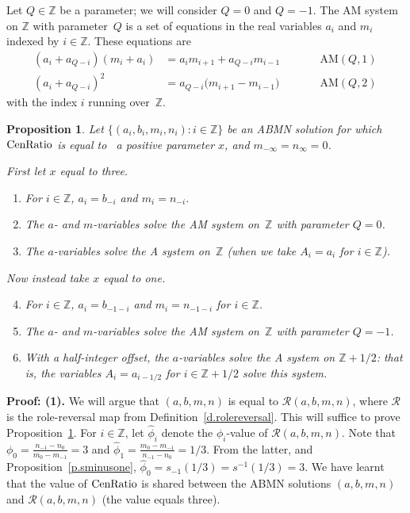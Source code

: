 \documentclass[letterpaper,11pt,oneside,reqno]{amsbook}
\newcommand{\Z}{\ensuremath{\mathbb{Z}}}
\numberwithin{figure}{chapter}
\newtheorem{proposition}[theorem]{Proposition}
\theoremstyle{definition}
\theoremstyle{definition}
\theoremstyle{definition}
\theoremstyle{definition}
\theoremstyle{definition}
\newcommand{\mc}{\mathcal}
\newcommand{\centralratio}{{\rm CenRatio}}
\newcommand{\abmnmacspace}{\textrm{ABMN} }
\newcommand{\ammacspace}{\textrm{AM} }
\newcommand{\amacspace}{\textrm{A} }
\begin{document}
Let $Q \in \Z$ be a parameter; we will consider $Q =0$ and $Q=-1$. The \ammacspace system on $\Z$ with parameter~$Q$ is a set of equations in the real variables $a_i$ and $m_i$ indexed by $i \in \Z$. These equations are
\begin{align*}
  (a_i + a_{Q-i})(m_i+a_i)  & =  a_i m_{i+1} + a_{Q-i} m_{i-1} && \qquad \textrm{AM}(Q,1)  \\
    (a_i + a_{Q-i})^2  & =  a_{Q-i} \big( m_{i+1} - m_{i-1} \big)  && \qquad \textrm{AM}(Q,2) \, 
  \end{align*}
with the index $i$ running over~$\Z$.
\begin{proposition}\label{p.symmetric}
Let $\big\{ (a_i,b_i,m_i,n_i): i \in \Z \big\}$ be an \abmnmacspace solution for which $\centralratio$ is equal to~ a positive parameter $x$, and $m_{-\infty} = n_\infty = 0$.

First let $x$ equal to three. 
\begin{enumerate}
\item For $i \in \Z$, $a_i = b_{-i}$ and $m_i = n_{-i}$.  
\item The $a$- and $m$-variables solve the \ammacspace system on~$\Z$ with parameter $Q= 0$. 
\item The $a$-variables solve the \amacspace system on~$\Z$ (when we take $A_i = a_i$ for $i \in \Z$).
 \end{enumerate}
 Now instead take $x$ equal to one.  
 \begin{enumerate}
 \setcounter{enumi}{3}
\item For $i \in \Z$,  $a_i = b_{-1-i}$ and $m_i = n_{-1-i}$ for $i \in \Z$. 
\item The $a$- and $m$-variables solve the \ammacspace system on~$\Z$ with parameter $Q= -1$.
\item 
With a half-integer offset, the $a$-variables solve the \amacspace system on $\Z + 1/2$: that is, the variables $A_i = a_{i-1/2}$ for $i \in \Z + 1/2$ solve this system.
\end{enumerate}
\end{proposition}
{\bf Proof: (1).} We will argue that $(a,b,m,n)$ is equal to $\mc{R}(a,b,m,n)$, where $\mc{R}$ is the role-reversal map from Definition~\ref{d.rolereversal}.
This will suffice to prove Proposition~\ref{p.symmetric}. For $i \in \Z$, let $\hat\phi_i$ denote the $\phi_i$-value of  $\mc{R}(a,b,m,n)$. 
Note that $\phi_0 = \tfrac{n_{-1} - n_0}{m_0 - m_{-1}} = 3$ and $\hat\phi_1 = \tfrac{m_0 - m_{-1}}{n_{-1} - n_0} = 1/3$. From the latter, and Proposition~\ref{p.sminusone}, $\hat\phi_0 = s_{-1}(1/3) = s^{-1}(1/3) = 3$.
We have learnt that the value of $\centralratio$ is shared between the \abmnmacspace solutions $(a,b,m,n)$ and $\mc{R}(a,b,m,n)$ (the value equals three). 
\end{document}

